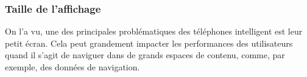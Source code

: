 






\subsubsection*{Taille de l'affichage}
On l'a vu, une des principales problématiques des téléphones intelligent est leur petit écran. Cela peut grandement impacter les performances des utilisateurs quand il s'agit de naviguer dans de grands espaces de contenu, comme, par exemple, des données de navigation.

